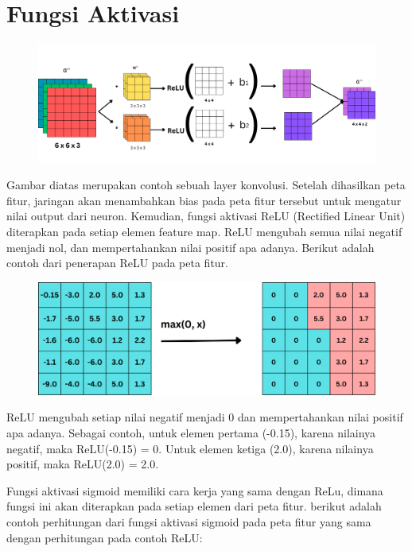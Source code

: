 
\section{Fungsi Aktivasi}

\begin{figure}[H]
	\centering
	\includegraphics[scale=.15]{gambar/lampiran/feed-fwrd.png}
\end{figure}

\noindent Gambar diatas merupakan contoh sebuah layer konvolusi. Setelah dihasilkan peta fitur, jaringan akan menambahkan bias pada peta fitur tersebut untuk mengatur nilai output dari neuron. Kemudian, fungsi aktivasi ReLU (Rectified Linear Unit) diterapkan pada setiap elemen feature map. ReLU mengubah semua nilai negatif menjadi nol, dan mempertahankan nilai positif apa adanya. Berikut adalah contoh dari penerapan ReLU pada peta fitur.

\begin{figure}[H]
	\centering
	\includegraphics[scale=.2]{gambar/lampiran/fungsi-relu.png}
\end{figure}

ReLU mengubah setiap nilai negatif menjadi 0 dan mempertahankan nilai positif apa adanya. Sebagai contoh, untuk elemen pertama (-0.15), karena nilainya negatif, maka ReLU(-0.15) = 0.  Untuk elemen ketiga (2.0), karena nilainya positif, maka ReLU(2.0) = 2.0.

\noindent Fungsi aktivasi sigmoid memiliki cara kerja yang sama dengan ReLu, dimana fungsi ini akan diterapkan pada setiap elemen dari peta fitur. berikut adalah contoh perhitungan dari fungsi aktivasi sigmoid pada peta fitur yang sama dengan perhitungan pada contoh ReLU:

